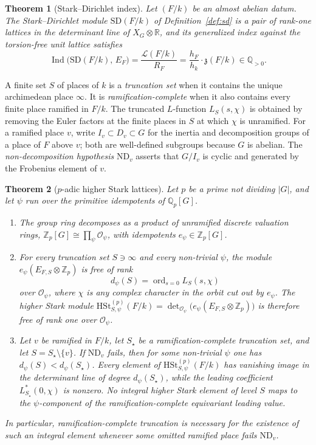 \documentclass[11pt]{article}
\theoremstyle{plain}
\newtheorem{theorem}{Theorem}[section]
\theoremstyle{definition}
\theoremstyle{remark}
\newcommand{\Z}{\mathbb{Z}}
\newcommand{\Q}{\mathbb{Q}}
\newcommand{\R}{\mathbb{R}}
\newcommand{\OK}{\mathcal{O}}
\newcommand{\Ind}{\operatorname{Ind}}
\newcommand{\ord}{\operatorname{ord}}
\newcommand{\SD}{\mathrm{SD}}
\newcommand{\HSt}{\mathrm{HSt}}
\begin{document}
\begin{theorem}[Stark--Dirichlet index]
\label{thm:A}
Let $(F/k)$ be an almost abelian datum.
The Stark--Dirichlet module $\SD(F/k)$ of Definition~\ref{def:sd} is a pair of rank-one lattices in the determinant line of $X_G\otimes\R$, and its generalized index against the torsion-free unit lattice satisfies
\[
  \Ind\bigl(\SD(F/k),\,E_F\bigr)
  =\frac{\mathcal{L}(F/k)}{R_F}
  =\frac{h_F}{h_k}\cdot\mathfrak{z}(F/k)\in\Q_{>0}.
\]
\end{theorem}

A finite set $S$ of places of $k$ is a \emph{truncation set} when it contains the unique archimedean place $\infty$.
It is \emph{ramification-complete} when it also contains every finite place ramified in $F/k$.
The truncated $L$-function $L_S(s,\chi)$ is obtained by removing the Euler factors at the finite places in $S$ at which $\chi$ is unramified.
For a ramified place $v$, write $I_v\subset D_v\subset G$ for the inertia and decomposition groups of a place of $F$ above $v$; both are well-defined subgroups because $G$ is abelian.
The \emph{non-decomposition hypothesis} $\mathrm{ND}_v$ asserts that $G/I_v$ is cyclic and generated by the Frobenius element of $v$.

\begin{theorem}[$p$-adic higher Stark lattices]
\label{thm:B}
Let $p$ be a prime not dividing $|G|$, and let $\psi$ run over the primitive idempotents of $\Q_p[G]$.
\begin{enumerate}[label=\textup{(\roman*)}]
\item The group ring decomposes as a product of unramified discrete valuation rings, $\Z_p[G]\cong\prod_{\psi}\OK_{\psi}$, with idempotents $e_{\psi}\in\Z_p[G]$.
\item For every truncation set $S\ni\infty$ and every non-trivial $\psi$, the module $e_{\psi}(E_{F,S}\otimes\Z_p)$ is free of rank
\[
  d_{\psi}(S)=\ord_{s=0}L_S(s,\chi)
\]
over $\OK_{\psi}$, where $\chi$ is any complex character in the orbit cut out by $e_{\psi}$.
The higher Stark module $\HSt_{S,\psi}^{(p)}(F/k)=\det_{\OK_{\psi}}\bigl(e_{\psi}(E_{F,S}\otimes\Z_p)\bigr)$ is therefore free of rank one over $\OK_{\psi}$.
\item Let $v$ be ramified in $F/k$, let $S_{\star}$ be a ramification-complete truncation set, and let $S=S_{\star}\setminus\{v\}$.
If $\mathrm{ND}_v$ fails, then for some non-trivial $\psi$ one has $d_{\psi}(S)<d_{\psi}(S_{\star})$.
Every element of $\HSt_{S,\psi}^{(p)}(F/k)$ has vanishing image in the determinant line of degree $d_{\psi}(S_{\star})$, while the leading coefficient $L_{S_{\star}}^{*}(0,\chi)$ is nonzero.
No integral higher Stark element of level $S$ maps to the $\psi$-component of the ramification-complete equivariant leading value.
\end{enumerate}
In particular, ramification-complete truncation is necessary for the existence of such an integral element whenever some omitted ramified place fails $\mathrm{ND}_v$.
\end{theorem}
\end{document}
